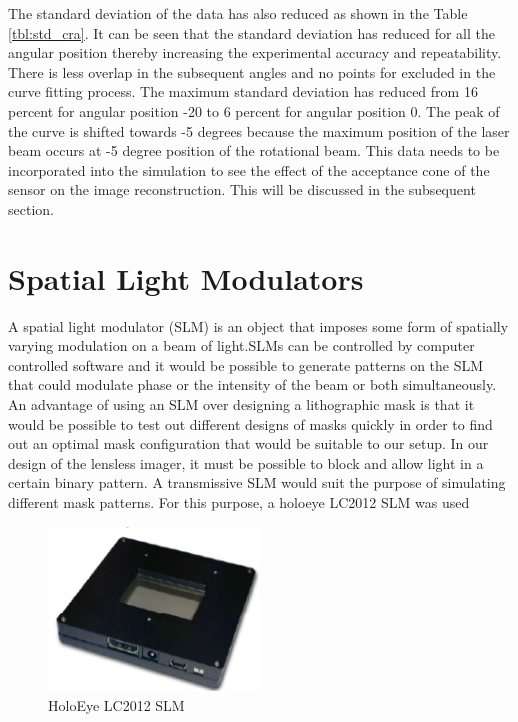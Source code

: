 The standard deviation of the data has also reduced as shown in the Table \ref{tbl:std_cra}. It can be seen that the standard deviation has reduced for all the angular position thereby increasing the experimental accuracy and repeatability. There is less overlap in the subsequent angles and no points for excluded in the curve fitting process. The maximum standard deviation has reduced from 16 percent for angular position -20 to 6 percent for angular position 0. The peak of the curve is shifted towards -5 degrees because the maximum position of the laser beam occurs at -5 degree position of the rotational beam. This data needs to be incorporated into the simulation to see the effect of the acceptance cone of the sensor on the image reconstruction. This will be discussed in the subsequent section.

\section{Spatial Light Modulators}
A spatial light modulator (SLM) is an object that imposes some form of spatially varying modulation on a beam of light\cite{SLMWiki}.SLMs can be controlled by computer controlled software and it would be possible to generate patterns on the SLM that could modulate phase or the intensity of the beam or both simultaneously. An advantage of using an SLM over designing a lithographic mask is that it would be possible to test out different designs of masks quickly in order to find out an optimal mask configuration that would be suitable to our setup. In our design of the lensless imager, it must be possible to block and allow light in a certain binary pattern. A transmissive SLM would suit the purpose of simulating different mask patterns. For this purpose, a holoeye LC2012 SLM was used 

\begin{figure}[ht]
\centering
\includegraphics[width=0.5\textwidth]{pics/slm}
\caption{HoloEye LC2012 SLM}
\label{fig:slm}
\end{figure}
